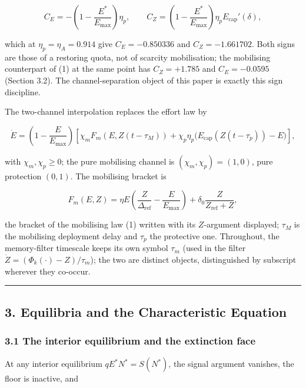 \documentclass[11pt]{article}
\begin{document}
\[C_E = -\left(1 - \frac{E^*}{E_{\max}}\right)\eta_p, \qquad C_Z = \left(1 - \frac{E^*}{E_{\max}}\right)\eta_p E_{\mathrm{cap}}'(\delta),\]

which at \(\eta_p = \eta_A = 0.914\) give \(C_E = -0.850336\) and
\(C_Z = -1.661702\). Both signs are those of a restoring quota, not of
scarcity mobilisation; the mobilising counterpart of (1) at the same
point has \(C_Z = +1.785\) and \(C_E = -0.0595\) (Section 3.2). The
channel-separation object of this paper is exactly this sign discipline.

The two-channel interpolation replaces the effort law by

\[\dot E = \left(1 - \frac{E}{E_{\max}}\right)\left[ \chi_m F_m(E, Z(t-\tau_M)) + \chi_p \eta_p \bigl( E_{\mathrm{cap}}(Z(t-\tau_p)) - E \bigr) \right], \tag{4}\]

with \(\chi_m, \chi_p \ge 0\); the pure mobilising channel is
\((\chi_m, \chi_p) = (1, 0)\), pure protection \((0, 1)\). The
mobilising bracket is

\[F_m(E, Z) = \eta E\left( \frac{Z}{\Delta_{\mathrm{ref}}} - \frac{E}{E_{\max}} \right) + \delta_0 \frac{Z}{Z_{\mathrm{ref}} + Z},\]

the bracket of the mobilising law (1) written with its \(Z\)-argument
displayed; \(\tau_M\) is the mobilising deployment delay and \(\tau_p\)
the protective one. Throughout, the memory-filter timescale keeps its
own symbol \(\tau_m\) (used in the filter
\(\dot Z = (\Phi_k(\cdot) - Z)/\tau_m\)); the two are distinct objects,
distinguished by subscript wherever they co-occur.

\begin{center}\rule{0.5\linewidth}{0.5pt}\end{center}

\subsection{3. Equilibria and the Characteristic
Equation}\label{equilibria-and-the-characteristic-equation}

\subsubsection{3.1 The interior equilibrium and the extinction
face}\label{the-interior-equilibrium-and-the-extinction-face}

At any interior equilibrium \(qE^*N^* = S(N^*)\), the signal argument
vanishes, the floor is inactive, and
\end{document}
